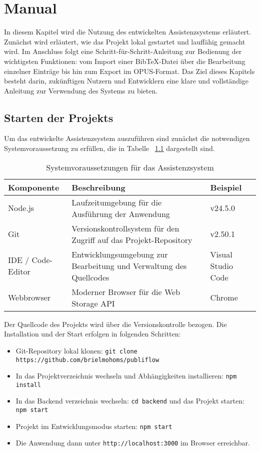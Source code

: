 \chapter{Manual}
In diesem Kapitel wird die Nutzung des entwickelten Assistenzsystems erläutert. 
Zunächst wird erläutert, wie das Projekt lokal gestartet und lauffähig gemacht 
wird. Im Anschluss folgt eine Schritt-für-Schritt-Anleitung zur Bedienung der 
wichtigsten Funktionen: vom Import einer BibTeX-Datei über die Bearbeitung 
einzelner Einträge bis hin zum Export im OPUS-Format. Das Ziel dieses Kapitels 
besteht darin, zukünftigen Nutzern und Entwicklern eine klare und vollständige 
Anleitung zur Verwendung des Systems zu bieten.


\section{Starten der Projekts}
Um das entwickelte Assistenzsystem auszuführen sind zunächst
die notwendigen Systemvoraussetzung zu erfüllen, die in Tabelle
~\ref{tab:systemvoraussetzungen} dargestellt sind. 

\begin{table}[h]
\centering
\begin{tabular}{|l|p{8cm}|l|}
\hline
\textbf{Komponente} & \textbf{Beschreibung} & \textbf{Beispiel} \\
\hline
Node.js & Laufzeitumgebung für die Ausführung der Anwendung & v24.5.0 \\
\hline
Git & Versionskontrollsystem für den Zugriff auf das Projekt-Repository & v2.50.1 \\
\hline
IDE / Code-Editor & Entwicklungsumgebung zur Bearbeitung und Verwaltung des Quellcodes & Visual Studio Code \\
\hline
Webbrowser & Moderner Browser für die Web Storage API & Chrome \\
\hline
\end{tabular}
\caption{Systemvoraussetzungen für das Assistenzsystem}
\label{tab:systemvoraussetzungen}
\end{table}

\noindent Der Quellcode des Projekts wird über die Versionskontrolle bezogen. Die Installation und der Start erfolgen in folgenden Schritten:

\begin{itemize}
    \item Git-Repository lokal klonen: \texttt{git clone https://github.com/brielmohoms/publiflow}

    \item In das Projektverzeichnis wechseln und Abhängigkeiten installieren: \texttt{npm install}
    
    \item In das Backend verzeichnis wechseln: \texttt{cd backend} und das Projekt starten: \texttt{npm start}

    \item Projekt im Entwicklungsmodus starten: \texttt{npm start}

    \item Die Anwendung dann unter \texttt{http://localhost:3000} im Browser erreichbar.
\end{itemize}


